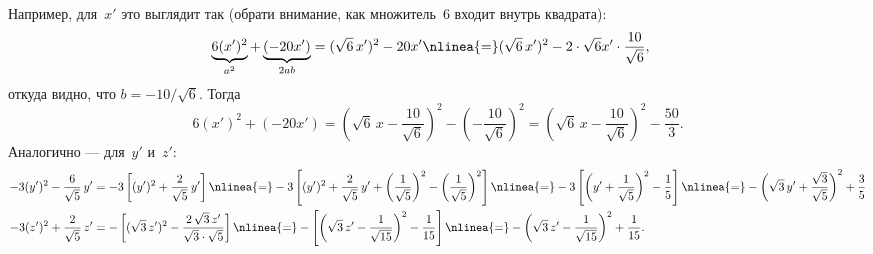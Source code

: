 \begin{solution}
	Например, для~$x'$ это выглядит так (обрати внимание, как множитель~$6$ входит внутрь квадрата):
	\begin{align*}
		\underbrace{6(x')^2}_{a^2} + 
		\underbrace{(- 20x')}_{2ab} &=
		(\sqrt{6}\,x')^2 - 20x'
		\nlinea{=}
		(\sqrt{6}\,x')^2 -
		2 \cdot \sqrt{6} x' \cdot \frac{10}{\sqrt{6}},
	\end{align*}
	откуда видно, что $b = -10/\sqrt{6}$. Тогда
	\[
		6(x')^2 + 
		(- 20x') =
		\left( 
			\sqrt{6}\,x - \frac{10}{\sqrt{6}}
		\right)^2
		-
		\left( 
			- \frac{10}{\sqrt{6}}
		\right)^2
		=
		\left( 
			\sqrt{6}\,x - \frac{10}{\sqrt{6}}
		\right)^2
		-
		\frac{50}{3}
		.
	\]
	Аналогично --- для~$y'$ и~$z'$:
	\begin{align*}
		-3(y')^2 - \frac{6}{\sqrt{5}}\,y' &=
		-3
		\left[ 
			(y')^2 + \frac{2}{\sqrt{5}}\,y'
		\right]
		\nlinea{=}
		-3
		\left[ 
			(y')^2 + \frac{2}{\sqrt{5}}\,y' +
			\left( 
				\frac{1}{\sqrt{5}}
			\right)^2
			-
			\left( 
				\frac{1}{\sqrt{5}}
			\right)^2
		\right]
		\nlinea{=}
		-3
		\left[ 
			\left( 
				y' +
				\frac{1}{\sqrt{5}}
			\right)^2
			-
			\frac{1}{5}
		\right]
		\nlinea{=}
		-
		\left( 
			\sqrt{3}\,y' +
			\frac{\sqrt{3}}{\sqrt{5}}
		\right)^2
		+
		\frac{3}{5}
		\\
		-3(z')^2 + \frac{2}{\sqrt{5}}\,z' &=
		-
		\left[ 
			(\sqrt{3}\,z')^2 - \frac{2\,\sqrt{3}\,z'}{\sqrt{3} \cdot \sqrt{5}}
		\right]
		\nlinea{=}
		-
		\left[ 
			\left( 
				\sqrt{3}\,z' - \frac{1}{\sqrt{15}}
			\right)^2
			-
			\frac{1}{15}
		\right] \nlinea{=}
		-
		\left( 
			\sqrt{3}\,z' - \frac{1}{\sqrt{15}}
		\right)^2
		+
		\frac{1}{15}
		.
	\end{align*}


\end{solution}
